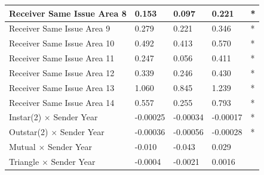 \documentclass[headsepline=true, abstracton]{scrartcl}
\begin{document}
\begin{table}[htp]
\begin{tabular}{|
>{\columncolor[HTML]{EFEFEF}}l |l|l|l|l|}
Receiver Same Issue Area 8                         & 0.153                            & 0.097                               & 0.221                               & *                                    \\ \hline
Receiver Same Issue Area 9                         & 0.279                            & 0.221                               & 0.346                               & *                                    \\ \hline
Receiver Same Issue Area 10                        & 0.492                            & 0.413                               & 0.570                               & *                                    \\ \hline
Receiver Same Issue Area 11                        & 0.247                            & 0.056                               & 0.411                               & *                                    \\ \hline
Receiver Same Issue Area 12                        & 0.339                            & 0.246                               & 0.430                               & *                                    \\ \hline
Receiver Same Issue Area 13                        & 1.060                            & 0.845                               & 1.239                               & *                                    \\ \hline
Receiver Same Issue Area 14                        & 0.557                            & 0.255                               & 0.793                               & *                                    \\ \hline
Instar(2) $\times$ Sender Year                     & -0.00025                         & -0.00034                            & -0.00017                            & *                                    \\ \hline
Outstar(2) $\times$ Sender Year                    & -0.00036                         & -0.00056                            & -0.00028                            & *                                    \\ \hline
Mutual $\times$ Sender Year                        & -0.010                           & -0.043                              & 0.029                               &                                      \\ \hline
Triangle $\times$ Sender Year                      & -0.0004                          & -0.0021                             & 0.0016                              &                                      \\ \hline

\end{tabular}
\end{table}
\end{document}

